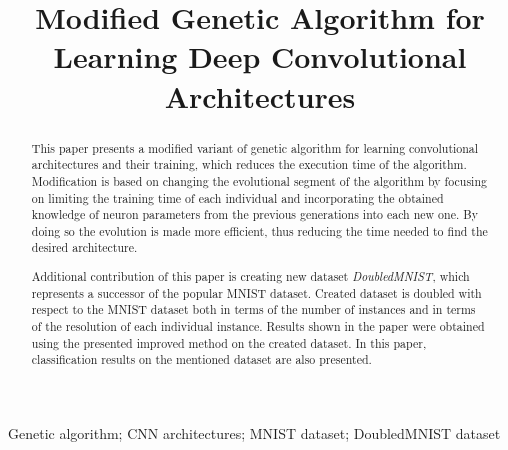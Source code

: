 \documentclass[eng]{simposium}
\begin{document}
\begin{frontmatter}


\title{Modified Genetic Algorithm for Learning Deep Convolutional Architectures}

\author{\textbf{ }}
\address{Faculty of Mathematics, University of Belgrade, Studentski trg 16, 11000 Belgrade\\
}
\author{\textbf{ }}
\address{Microsoft Development Center Serbia, Španskih boraca 3, 11000 Belgrade\\
}
\author{\textbf{ }}
\address{Faculty of Mathematics, University of Belgrade, Studentski trg 16, 11000 Belgrade\\
}


\maketitle
\begin{abstract}

This paper presents a modified variant of genetic algorithm for learning convolutional architectures and their training, which reduces the execution time of the algorithm.  
Modification is based on changing the evolutional segment of the algorithm by focusing on limiting the training time of each individual and incorporating the  
obtained knowledge of neuron parameters from the previous generations into each new one. By doing so the evolution is made more efficient, thus reducing the time  
needed to find the desired architecture. 

Additional contribution of this paper is creating new dataset \textit{DoubledMNIST}, which represents a successor of the popular MNIST dataset. 
Created dataset is doubled with respect to the MNIST dataset both in terms of the number of instances and in terms of the resolution of each individual instance. 
Results shown in the paper were obtained using the presented improved method on the created dataset. In this paper, classification results on the mentioned dataset are also presented. 
\end{abstract} 

\begin{keyword} 
Genetic algorithm; CNN architectures; MNIST dataset; DoubledMNIST dataset 
\end{keyword} 

\end{frontmatter} 
\end{document}
